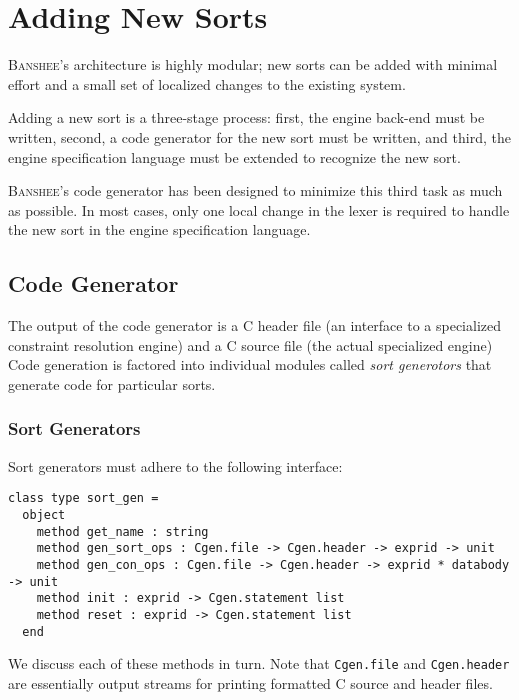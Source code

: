 \documentclass{article}
\newcommand{\banshee}{\textsc{Banshee}}
\begin{document}
\section{Adding New Sorts}

\banshee{}'s architecture is highly modular; new sorts can be added with 
minimal effort and a small set of localized changes to the existing system.

Adding a new sort is a three-stage process: first, the engine back-end must be
written, second, a code generator for the new sort must be written, and third,
the engine specification language must be extended to recognize the new sort.

\banshee{}'s code generator has been designed to minimize this third task as 
much as possible. In most cases, only one local change in the lexer is 
required to handle the new sort in the engine specification language.

\subsection{Code Generator}

The output of the code generator is a C header file (an interface to a specialized constraint resolution engine) and a C source file (the actual specialized engine) 
Code generation is factored into individual modules called  
\emph{sort generotors} that generate code for particular sorts.

\subsubsection{Sort Generators}

Sort generators must adhere to the following interface:

\begin{verbatim}
class type sort_gen = 
  object
    method get_name : string
    method gen_sort_ops : Cgen.file -> Cgen.header -> exprid -> unit
    method gen_con_ops : Cgen.file -> Cgen.header -> exprid * databody -> unit
    method init : exprid -> Cgen.statement list
    method reset : exprid -> Cgen.statement list
  end
\end{verbatim}

We discuss each of these methods in turn. Note that \texttt{Cgen.file} and 
\texttt{Cgen.header} are essentially output streams for printing formatted C 
source and header files. 
\end{document}
